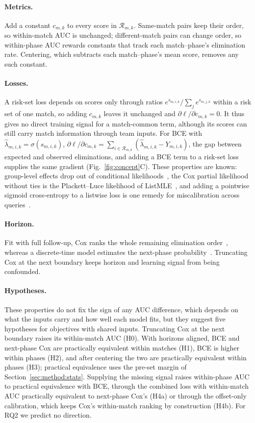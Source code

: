\documentclass[sigconf,anonymous]{acmart}
\begin{document}
\paragraph{Metrics.}
Add a constant $c_{m,k}$ to every score in $\mathcal{R}_{m,k}$. Same-match pairs keep their order, so within-match AUC is unchanged; different-match pairs can change order, so within-phase AUC rewards constants that track each match--phase's elimination rate. Centering, which subtracts each match--phase's mean score, removes any such constant.

\paragraph{Losses.}
A risk-set loss depends on scores only through ratios $e^{s_{m,i,k}}/\sum_{j}e^{s_{m,j,k}}$ within a risk set of one match, so adding $c_{m,k}$ leaves it unchanged and $\partial\ell/\partial c_{m,k}=0$. It thus gives no direct training signal for a match-common term, although its scores can still carry match information through team inputs. For BCE with $\hat\lambda_{m,i,k}=\sigma(s_{m,i,k})$, $\partial\ell/\partial c_{m,k}=\sum_{i\in\mathcal{R}_{m,k}}(\hat\lambda_{m,i,k}-Y_{m,i,k})$, the gap between expected and observed eliminations, and adding a BCE term to a risk-set loss supplies the same gradient (Fig.~\ref{fig:concept}C). These properties are known: group-level effects drop out of conditional likelihoods~\cite{Chamberlain80}, the Cox partial likelihood without ties is the Plackett--Luce likelihood of ListMLE~\cite{Xia08}, and adding a pointwise sigmoid cross-entropy to a listwise loss is one remedy for miscalibration across queries~\cite{Bai23}.

\paragraph{Horizon.}
Fit with full follow-up, Cox ranks the whole remaining elimination order~\cite{Cox72}, whereas a discrete-time model estimates the next-phase probability~\cite{SingerWillett93,Gensheimer19}. Truncating Cox at the next boundary keeps horizon and learning signal from being confounded.

\paragraph{Hypotheses.}
These properties do not fix the sign of any AUC difference, which depends on what the inputs carry and how well each model fits, but they suggest five hypotheses for objectives with shared inputs. Truncating Cox at the next boundary raises its within-match AUC (H0). With horizons aligned, BCE and next-phase Cox are practically equivalent within matches (H1), BCE is higher within phases (H2), and after centering the two are practically equivalent within phases (H3); practical equivalence uses the pre-set margin of Section~\ref{sec:method:stats}. Supplying the missing signal raises within-phase AUC to practical equivalence with BCE, through the combined loss with within-match AUC practically equivalent to next-phase Cox's (H4a) or through the offset-only calibration, which keeps Cox's within-match ranking by construction (H4b). For RQ2 we predict no direction.
\end{document}
